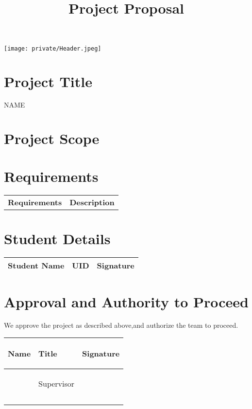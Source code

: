 \documentclass{article}
\title{Project Proposal}
\author{}
\date{}
\begin{document}
\texttt{[image: private/Header.jpeg]}
\vspace{3em}

\section{Project Title}

\Large{NAME}

\section{Project Scope}


\section{Requirements}

\begin{tabular}{ll}
\textbf{Requirements} & \textbf{Description} \\
\end{tabular}

\section*{Student Details}

\begin{center}
\begin{tabular}{ |m{}|m{6em}|m{7em}| }
    \hline
    \textbf{Student Name} & \textbf{UID} & \textbf{Signature} \\
    \hline
\end{tabular}
\end{center}

\section*{Approval and Authority to Proceed}

We approve the project as described above,and authorize the team to proceed.


\begin{center}
\begin{tabular}{ |p{9em}|p{9em}|p{9em}| }
    \hline
    \begin{center}\textbf{Name}\end{center} & \begin{center}\textbf{Title}\end{center} & \begin{center}\textbf{Signature}\end{center} \\
    \hline
    &\begin{center}{Supervisor}\end{center}&\\
    \hline
    &&\\
    &&\\
    \hline
\end{tabular}
\end{center}
\end{document}
